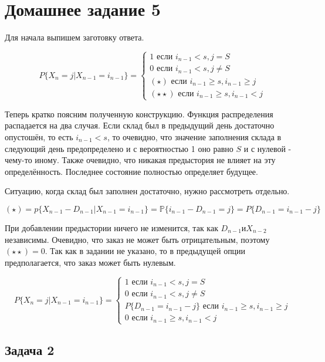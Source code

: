 \documentclass[a4paper,12pt]{article}
\def \mbb{\mathbb}
\def \P{\mbb{P}}
\begin{document}
\section{Домашнее задание 5}

Для начала выпишем заготовку ответа.

\[ P\{ X_n = j | X_{n-1} = i_{n-1} \} = 
\begin{cases}
1  \text{ если } i_{n-1} < s, j = S \\
0  \text{ если } i_{n-1} < s, j \neq S\\
(\star) \text{ если } i_{n-1} \ge s, i_{n-1} \ge j\\
(\star \star) \text{ если } i_{n-1} \ge s, i_{n-1} < j
\end{cases}\]

Теперь кратко поясним полученную конструкцию. Функция распределения распадается на два случая. Если склад был в предыдущий день достаточно опустошён, то есть  $ i_{n-1} < s $, то очевидно, что значение заполнения склада в следующий день предопределено и с вероятностью 1 оно равно $S$ и с нулевой - чему-то иному. Также очевидно, что никакая предыстория не влияет на эту определённость. Последнее состояние полностью определяет будущее.

Ситуацию, когда склад был заполнен достаточно, нужно рассмотреть отдельно.

\[ (\star) = p\{ X_{n-1} - D_{n-1} | X_{n-1} = i_{n-1} \} = \P\{ i_{n-1} - D_{n-1}  = j \} = P\{ D_{n-1} = i_{n-1} - j \} \] 

При добавлении предыстории ничего не изменится, так как $ D_{n-1} \text{и} X_{n-2} $ независимы.
Очевидно, что заказ не может быть отрицательным, поэтому $ (\star \star) = 0 $. Так как в задании не указано, то в предыдущей опции предполагается, что заказ может быть нулевым.


\[ P\{ X_n = j | X_{n-1} = i_{n-1} \} = 
\begin{cases}
1  \text{ если } i_{n-1} < s, j = S \\
0  \text{ если } i_{n-1} < s, j \neq S\\
P\{ D_{n-1} = i_{n-1} - j \} \text{ если } i_{n-1} \ge s, i_{n-1} \ge j\\
0 \text{ если } i_{n-1} \ge s, i_{n-1} < j
\end{cases}\]

\subsection{Задача 2}
\end{document}
